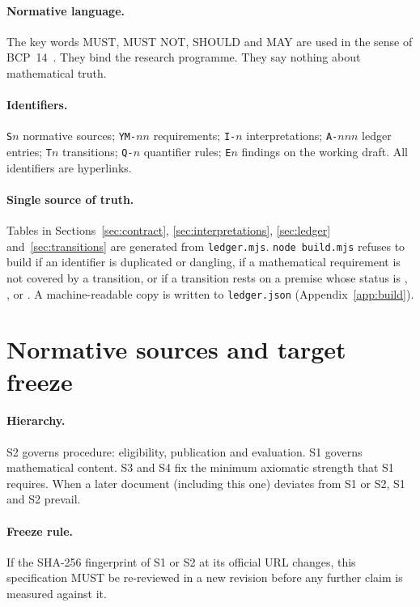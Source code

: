 \documentclass[11pt,a4paper]{article}
\begin{document}
\paragraph{Normative language.} The key words MUST, MUST NOT, SHOULD and MAY are used in the sense of BCP~14~\cite{RFC2119,RFC8174}. They bind the research programme. They say nothing about mathematical truth.

\paragraph{Identifiers.} \texttt{S}$n$ normative sources; \texttt{YM-}$nn$ requirements; \texttt{I-}$n$ interpretations; \texttt{A-}$nnn$ ledger entries; \texttt{T}$n$ transitions; \texttt{Q-}$n$ quantifier rules; \texttt{E}$n$ findings on the working draft. All identifiers are hyperlinks.

\paragraph{Single source of truth.} Tables in Sections~\ref{sec:contract}, \ref{sec:interpretations}, \ref{sec:ledger} and~\ref{sec:transitions} are generated from \texttt{ledger.mjs}. \texttt{node build.mjs} refuses to build if an identifier is duplicated or dangling, if a mathematical requirement is not covered by a transition, or if a transition rests on a premise whose status is , ,  or . A machine-readable copy is written to \texttt{ledger.json} (Appendix~\ref{app:build}).

\section{Normative sources and target freeze}\label{sec:sources}



\paragraph{Hierarchy.} S2 governs procedure: eligibility, publication and evaluation. S1 governs mathematical content. S3 and S4 fix the minimum axiomatic strength that S1 requires. When a later document (including this one) deviates from S1 or S2, S1 and S2 prevail.

\paragraph{Freeze rule.} If the SHA-256 fingerprint of S1 or S2 at its official URL changes, this specification MUST be re-reviewed in a new revision before any further claim is measured against it.
\end{document}

